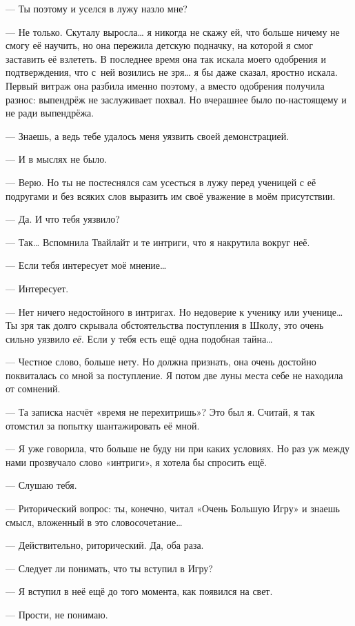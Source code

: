 \documentclass[fontsize=11pt,a5paper,titlepage=firstcover]{scrbook}
\begin{document}
--- Ты поэтому и уселся в лужу назло мне?

--- Не только. Скуталу выросла{\ldots} я никогда не скажу ей, что больше ничему не смогу её научить, но она пережила детскую подначку, на которой я смог заставить её взлететь. В последнее время она так искала моего одобрения и подтверждения, что с~ней возились не зря{\ldots} я бы даже сказал, яростно искала. Первый витраж она разбила именно поэтому, а вместо одобрения получила разнос: выпендрёж не заслуживает похвал. Но вчерашнее было по-настоящему и не ради выпендрёжа.

--- Знаешь, а ведь тебе удалось меня уязвить своей демонстрацией.

--- И в мыслях не было.

--- Верю. Но ты не постеснялся сам усесться в лужу перед ученицей с её подругами и без всяких слов выразить им своё уважение в моём присутствии.

--- Да. И что тебя уязвило?

--- Так{\ldots} Вспомнила Твайлайт и те интриги, что я накрутила вокруг неё.

--- Если тебя интересует моё мнение{\ldots}

--- Интересует.

--- Нет ничего недостойного в интригах. Но недоверие к ученику или ученице{\ldots} Ты зря так долго скрывала обстоятельства поступления в Школу, это очень сильно уязвило \emph{её}. Если у тебя есть ещё одна подобная тайна{\ldots}

--- Честное слово, больше нету. Но должна признать, она очень достойно поквиталась со мной за поступление. Я потом две луны места себе не находила от сомнений.

--- Та записка насчёт «время не перехитришь»? Это был я. Считай, я так отомстил за попытку шантажировать её мной.

--- Я уже говорила, что больше не буду ни при каких условиях. Но раз уж между нами прозвучало слово «интриги», я хотела бы спросить ещё.

--- Слушаю тебя.

--- Риторический вопрос: ты, конечно, читал «Очень Большую Игру» и знаешь смысл, вложенный в это словосочетание{\ldots}

--- Действительно, риторический. Да, оба раза.

--- Следует ли понимать, что ты вступил в Игру?

--- Я вступил в неё ещё до того момента, как появился на свет.

--- Прости, не понимаю.
\end{document}
